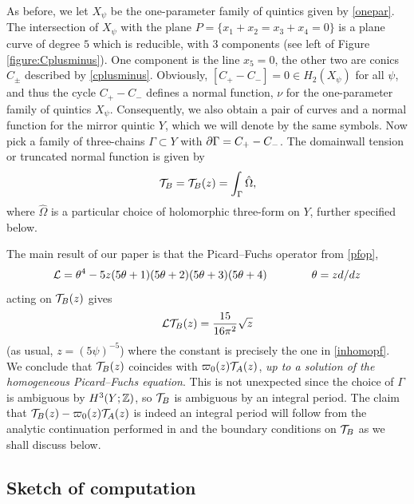 As before, we let $X_\psi$ be the one-parameter family of quintics given by 
\eqref{onepar}. The intersection of $X_\psi$ with the plane 
$P=\{x_1+x_2=x_3+x_4=0\}$ is a plane curve of degree $5$ which is reducible, 
with $3$ components (see left of Figure \ref{figure:Cplusminus}). One component 
is the line $x_5=0$, the other two are conics $C_\pm$ described by 
\eqref{cplusminus}. Obviously, $[C_+-C_-]=0 \in H_2(X_\psi)$ for all $\psi$, 
and thus the cycle $C_+-C_-$ defines a normal function, $\nu$ for the 
one-parameter family of quintics $X_\psi$. Consequently, we also obtain
a pair of curves and a normal function for the mirror quintic $Y$, which 
we will denote by the same symbols. Now pick a family of three-chains 
$\Gamma\subset Y$ with $\partial\Gamma=C_+-C_-$. The domainwall tension or
truncated normal function is given by
\begin{equation}
{\cal T}_B = {\cal T}_B(z) = \int_{\Gamma} \hat\Omega ,
\end{equation}
where $\hat\Omega$ is a particular choice of holomorphic three-form on $Y$, 
further specified below.

The main result of our paper is that the Picard--Fuchs operator from
\eqref{pfop},
\begin{equation}
\eqlabel{PF}
\call = \theta^4-5z(5\theta+1)(5\theta+2)(5\theta+3)(5\theta+4)
\qquad\qquad \theta = zd/dz
\end{equation}
acting on ${\cal T}_B(z)$ gives
\begin{equation}
\eqlabel{ePF}
\call \calt_B (z) = \frac{15}{16\pi^2} \sqrt{z}
\end{equation}
(as usual, $z=(5\psi)^{-5}$) where the constant is precisely the one 
in \eqref{inhomopf}. We conclude that ${\cal T}_B(z)$ coincides with 
$\varpi_0(z){\cal T}_A(z)$, {\it up to a solution of the homogeneous 
Picard--Fuchs equation}. This is not unexpected since the choice of 
$\Gamma$ is ambiguous by $H^3(Y;{\mathbb Z})$, so ${\cal T}_B$ is ambiguous 
by an integral period. The claim that ${\cal T}_B(z)-\varpi_0(z){\cal T}_A(z)$ 
is indeed an integral period will follow from the analytic continuation 
performed in \cite{open} and the boundary conditions on ${\cal T}_B$ as we 
shall discuss below.


\subsection{Sketch of computation}
\label{sketch}

